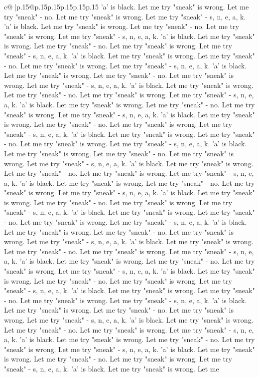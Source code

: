 \documentclass{article}
\begin{document}
{\begin{supertabular}{c@{$\;$}|p{.15\linewidth}@{}p{.15\linewidth}p{.15\linewidth}p{.15\linewidth}p{.15\linewidth}p{.15\linewidth}}
{{{'a' is black. Let me try "sneak" is wrong. Let me try "sneak" {-} no. Let me try "sneak" is wrong. Let me try "sneak" {-} s, n, e, a, k. 'a' is black. Let me try "sneak" is wrong. Let me try "sneak" {-} no. Let me try "sneak" is wrong. Let me try "sneak" {-} s, n, e, a, k. 'a' is black. Let me try "sneak" is wrong. Let me try "sneak" {-} no. Let me try "sneak" is wrong. Let me try "sneak" {-} s, n, e, a, k. 'a' is black. Let me try "sneak" is wrong. Let me try "sneak" {-} no. Let me try "sneak" is wrong. Let me try "sneak" {-} s, n, e, a, k. 'a' is black. Let me try "sneak" is wrong. Let me try "sneak" {-} no. Let me try "sneak" is wrong. Let me try "sneak" {-} s, n, e, a, k. 'a' is black. Let me try "sneak" is wrong. Let me try "sneak" {-} no. Let me try "sneak" is wrong. Let me try "sneak" {-} s, n, e, a, k. 'a' is black. Let me try "sneak" is wrong. Let me try "sneak" {-} no. Let me try "sneak" is wrong. Let me try "sneak" {-} s, n, e, a, k. 'a' is black. Let me try "sneak" is wrong. Let me try "sneak" {-} no. Let me try "sneak" is wrong. Let me try "sneak" {-} s, n, e, a, k. 'a' is black. Let me try "sneak" is wrong. Let me try "sneak" {-} no. Let me try "sneak" is wrong. Let me try "sneak" {-} s, n, e, a, k. 'a' is black. Let me try "sneak" is wrong. Let me try "sneak" {-} no. Let me try "sneak" is wrong. Let me try "sneak" {-} s, n, e, a, k. 'a' is black. Let me try "sneak" is wrong. Let me try "sneak" {-} no. Let me try "sneak" is wrong. Let me try "sneak" {-} s, n, e, a, k. 'a' is black. Let me try "sneak" is wrong. Let me try "sneak" {-} no. Let me try "sneak" is wrong. Let me try "sneak" {-} s, n, e, a, k. 'a' is black. Let me try "sneak" is wrong. Let me try "sneak" {-} no. Let me try "sneak" is wrong. Let me try "sneak" {-} s, n, e, a, k. 'a' is black. Let me try "sneak" is wrong. Let me try "sneak" {-} no. Let me try "sneak" is wrong. Let me try "sneak" {-} s, n, e, a, k. 'a' is black. Let me try "sneak" is wrong. Let me try "sneak" {-} no. Let me try "sneak" is wrong. Let me try "sneak" {-} s, n, e, a, k. 'a' is black. Let me try "sneak" is wrong. Let me try "sneak" {-} no. Let me try "sneak" is wrong. Let me try "sneak" {-} s, n, e, a, k. 'a' is black. Let me try "sneak" is wrong. Let me try "sneak" {-} no. Let me try "sneak" is wrong. Let me try "sneak" {-} s, n, e, a, k. 'a' is black. Let me try "sneak" is wrong. Let me try "sneak" {-} no. Let me try "sneak" is wrong. Let me try "sneak" {-} s, n, e, a, k. 'a' is black. Let me try "sneak" is wrong. Let me try "sneak" {-} no. Let me try "sneak" is wrong. Let me try "sneak" {-} s, n, e, a, k. 'a' is black. Let me try "sneak" is wrong. Let me try "sneak" {-} no. Let me try "sneak" is wrong. Let me try "sneak" {-} s, n, e, a, k. 'a' is black. Let me try "sneak" is wrong. Let me try "sneak" {-} no. Let me try "sneak" is wrong. Let me try "sneak" {-} s, n, e, a, k. 'a' is black. Let me try "sneak" is wrong. Let me try "sneak" {-} no. Let me try "sneak" is wrong. Let me try "sneak" {-} s, n, e, a, k. 'a' is black. Let me try "sneak" is wrong. Let me try "sneak" {-} no. Let me try "sneak" is wrong. Let me try "sneak" {-} s, n, e, a, k. 'a' is black. Let me try "sneak" is wrong. Let me }}}
\end{supertabular}}
\end{document}
